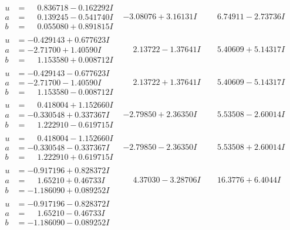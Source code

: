 \documentclass[1p]{elsarticle_modified}
\theoremstyle{definition}
\begin{document}
$$\begin{array}{c|c|c}
\begin{aligned}
u &= \phantom{-}0.836718 - 0.162292 I \\
a &= \phantom{-}0.139245 - 0.541740 I \\
b &= \phantom{-}0.055080 + 0.891815 I\end{aligned}
 & -3.08076 + 3.16131 I & \phantom{-}6.74911 - 2.73736 I \\ \hline\begin{aligned}
u &= -0.429143 + 0.677623 I \\
a &= -2.71700 + 1.40590 I \\
b &= \phantom{-}1.153580 + 0.008712 I\end{aligned}
 & \phantom{-}2.13722 - 1.37641 I & \phantom{-}5.40609 + 5.14317 I \\ \hline\begin{aligned}
u &= -0.429143 - 0.677623 I \\
a &= -2.71700 - 1.40590 I \\
b &= \phantom{-}1.153580 - 0.008712 I\end{aligned}
 & \phantom{-}2.13722 + 1.37641 I & \phantom{-}5.40609 - 5.14317 I \\ \hline\begin{aligned}
u &= \phantom{-}0.418004 + 1.152660 I \\
a &= -0.330548 + 0.337367 I \\
b &= \phantom{-}1.222910 - 0.619715 I\end{aligned}
 & -2.79850 + 2.36350 I & \phantom{-}5.53508 - 2.60014 I \\ \hline\begin{aligned}
u &= \phantom{-}0.418004 - 1.152660 I \\
a &= -0.330548 - 0.337367 I \\
b &= \phantom{-}1.222910 + 0.619715 I\end{aligned}
 & -2.79850 - 2.36350 I & \phantom{-}5.53508 + 2.60014 I \\ \hline\begin{aligned}
u &= -0.917196 + 0.828372 I \\
a &= \phantom{-}1.65210 + 0.46733 I \\
b &= -1.186090 + 0.089252 I\end{aligned}
 & \phantom{-}4.37030 - 3.28706 I & \phantom{-}16.3776 + 6.4044 I \\ \hline\begin{aligned}
u &= -0.917196 - 0.828372 I \\
a &= \phantom{-}1.65210 - 0.46733 I \\
b &= -1.186090 - 0.089252 I\end{aligned}

\end{array}$$
\end{document}
